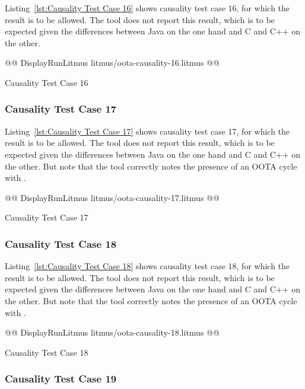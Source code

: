 \documentclass[10]{article}
\begin{document}
Listing~\ref{lst:Causality Test Case 16}
shows causality test case 16, for which the 
result is to be allowed.
The  tool does not report this result, which is to be expected
given the differences between Java on the one hand and C and C++
on the other.

\begin{listing}[tbp]
@@ DisplayRunLitmus litmus/oota-causality-16.litmus @@
\caption{Causality Test Case 16}
\label{lst:Causality Test Case 16}
\end{listing}

\subsubsection{Causality Test Case 17}
\label{app:Causality Test Case 17}

Listing~\ref{lst:Causality Test Case 17}
shows causality test case 17, for which the 
result is to be allowed.
The  tool does not report this result, which is to be expected
given the differences between Java on the one hand and C and C++
on the other.
But note that the  tool correctly notes the presence of an
OOTA cycle with .

\begin{listing}[tbp]
@@ DisplayRunLitmus litmus/oota-causality-17.litmus @@
\caption{Causality Test Case 17}
\label{lst:Causality Test Case 17}
\end{listing}

\subsubsection{Causality Test Case 18}
\label{app:Causality Test Case 18}

Listing~\ref{lst:Causality Test Case 18}
shows causality test case 18, for which the 
result is to be allowed.
The  tool does not report this result, which is to be expected
given the differences between Java on the one hand and C and C++
on the other.
But note that the  tool correctly notes the presence of an
OOTA cycle with .

\begin{listing}[tbp]
@@ DisplayRunLitmus litmus/oota-causality-18.litmus @@
\caption{Causality Test Case 18}
\label{lst:Causality Test Case 18}
\end{listing}

\subsubsection{Causality Test Case 19}
\label{app:Causality Test Case 19}
\end{document}

